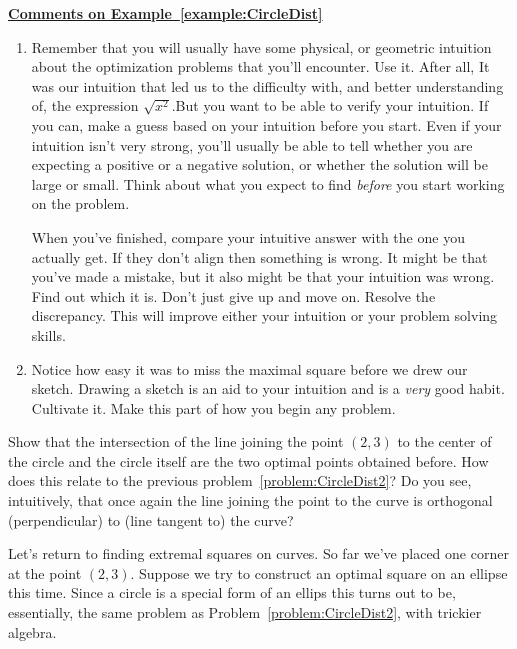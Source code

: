 \begin{myexample}
  \centerline{\underline{\bf{}Comments on Example~\ref{example:CircleDist}}}
  \begin{enumerate}
  \item Remember that you will usually have some physical, or
    geometric intuition about the optimization problems that you'll
    encounter. Use it. After all, It was our intuition that led us to
    the difficulty with, and better understanding of, the expression
    $\sqrt{x^2}$.But you want to be able to verify your intuition. If
    you can, make a guess based on your intuition before you start.
    Even if your intuition isn't very strong, you'll usually be able
    to tell whether you are expecting a positive or a negative
    solution, or whether the solution will be large or small. Think
    about what you expect to find \emph{before} you start working on
    the problem.

    When you've finished, compare your intuitive answer with the one you
    actually get. If they don't align then something is
    wrong. It might be that you've made a mistake, but it also might be
    that your intuition was wrong. Find out which it is. \alert{Don't}
    just give up and move on. Resolve the discrepancy. This will
    improve either your intuition or your problem solving skills.
  \item Notice how easy it was to miss the maximal square before we
    drew our sketch.  Drawing a sketch is an aid to your intuition and
    is a \emph{very} good habit. Cultivate it. Make this part of how
    you begin any problem.

  \end{enumerate}
\end{myexample}

\begin{ProficiencyDrill}
  \label{problem:CircleDist3}
  Show that the intersection of the line joining the point $(2,3)$ to
  the center of the circle and the circle itself are the two optimal
  points obtained before.  How does this relate to the previous
  problem~\ref{problem:CircleDist2}? Do you see, intuitively, that
  once again the line joining the point to the curve is orthogonal
  (perpendicular) to  (line tangent to) the curve?
\end{ProficiencyDrill}

Let's return to finding extremal squares on curves. So far we've placed
one corner at the point $(2,3)$. Suppose we try to
construct an optimal square on an ellipse this time. Since a circle is
a special form of an ellips this turns out to be, essentially, the same
problem as Problem~\ref{problem:CircleDist2}, with trickier algebra.

